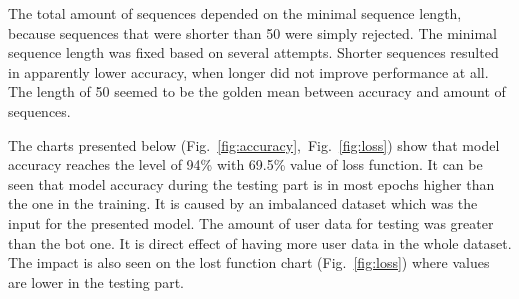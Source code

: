 The total amount of sequences depended on the minimal sequence length, because sequences that were shorter than \num{50} were simply rejected.
The minimal sequence length was fixed based on several attempts.
Shorter sequences resulted in apparently lower accuracy, when longer did not improve performance at all.
The length of \num{50} seemed to be the golden mean between accuracy and amount of sequences.

The charts presented below \mbox{(Fig.~\ref{fig:accuracy}, Fig.~\ref{fig:loss})} show that model accuracy reaches the level of \num{94}\% with \num{69.5}\% value of loss function.
It can be seen that model accuracy during the testing part is in most epochs higher than the one in the training.
It is caused by an imbalanced dataset which was the input for the presented model.
The amount of user data for testing was greater than the bot one.
It is direct effect of having more user data in the whole dataset.
The impact is also seen on the lost function chart \mbox{(Fig.~\ref{fig:loss})} where values are lower in the testing part.

